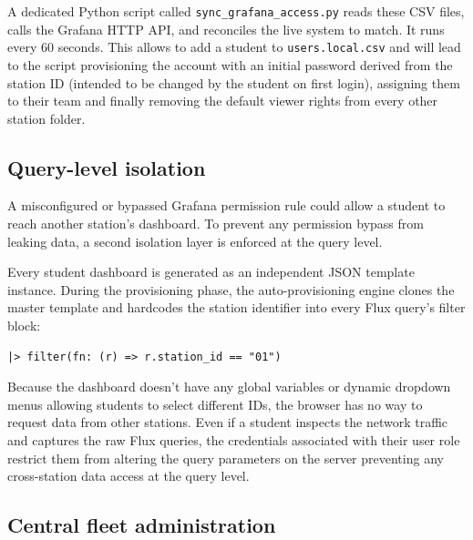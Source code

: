 A dedicated Python script called \texttt{sync\_grafana\_access.py} reads these CSV files, calls the Grafana HTTP API, and reconciles the live system to match. It runs every 60 seconds. This allows to add a student to \texttt{users.local.csv} and will lead to the script provisioning the account with an initial password derived from the station ID (intended to be changed by the student on first login), assigning them to their team and finally removing the default viewer rights from every other station folder.

\subsection{Query-level isolation}

A misconfigured or bypassed Grafana permission rule could allow a student to reach another station's dashboard. To prevent any permission bypass from leaking data, a second isolation layer is enforced at the query level.

Every student dashboard is generated as an independent JSON template instance. During the provisioning phase, the auto-provisioning engine clones the master template and hardcodes the station identifier into every Flux query's filter block:
\begin{verbatim}
|> filter(fn: (r) => r.station_id == "01")
\end{verbatim}
Because the dashboard doesn't have any global variables or dynamic dropdown menus allowing students to select different IDs, the browser has no way to request data from other stations. Even if a student inspects the network traffic and captures the raw Flux queries, the credentials associated with their user role restrict them from altering the query parameters on the server preventing any cross-station data access at the query level.

\subsection{Central fleet administration}


